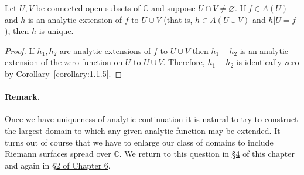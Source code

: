  Let $U,V$ be connected open subsets of $\mathbb C$ and suppose $U\cap V\ne\varnothing$. If $f\in A(U)$ and $h$ is an analytic extension of $f$ to $U\cup V$ (that is, $h\in A(U\cup V)$ and $h|U=f$), then $h$ is unique.
\begin{proof} If $h_1,h_2$ are analytic extensions of $f$ to $U\cup V$ then $h_1-h_2$ is an analytic extension of the zero function on $U$ to $U\cup V$. Therefore, $h_1-h_2$ is identically zero by Corollary~\ref{corollary:1.1.5}. \end{proof}
\paragraph*{Remark.} Once we have uniqueness of analytic continuation it is natural to try to construct the largest domain to which any given analytic function may be extended. It turns out of course that we have to enlarge our class of domains to include Riemann surfaces spread over $\mathbb C$. We return to this question in \hyperref[sec:1:4]{\S4} of this chapter and again in \hyperref[sec:6:2]{\S2 of Chapter 6}.

